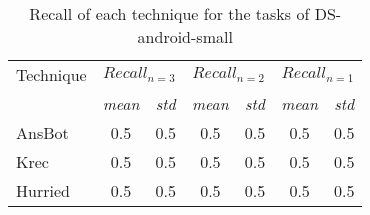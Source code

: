 \begin{table}[H]
\centering    
\begin{scriptsize}
\begin{threeparttable}
\begin{tabular}{lcccccc}

\hline


\multirow{2.5}{*}{Technique}
& \multicolumn{2}{c}{\textit{$Recall_{n=3}$}}
& \multicolumn{2}{c}{\textit{$Recall_{n=2}$}}
& \multicolumn{2}{c}{\textit{$Recall_{n=1}$}}
\\ \cmidrule(l){2-3} \cmidrule(l){4-5} \cmidrule(l){6-7} 


& \textit{mean}
& \textit{std}
& \textit{mean}
& \textit{std}
& \textit{mean}
& \textit{std}
\\


\hline
\hline

\acs{AnsBot} 
& 0.5 & 0.5 %
& 0.5 & 0.5 %
& 0.5 & 0.5 %
\\

\acs{Krec} 
& 0.5 & 0.5 %
& 0.5 & 0.5 %
& 0.5 & 0.5 %
\\

\acs{Hurried} 
& 0.5 & 0.5 %
& 0.5 & 0.5 %
& 0.5 & 0.5 %
\\

\hline

\end{tabular}
\end{threeparttable}
\end{scriptsize}
\caption{Recall of each technique for the tasks of \acs{DS-android-small}}
\label{tbl:ds-small-results-recall}
\end{table}

    